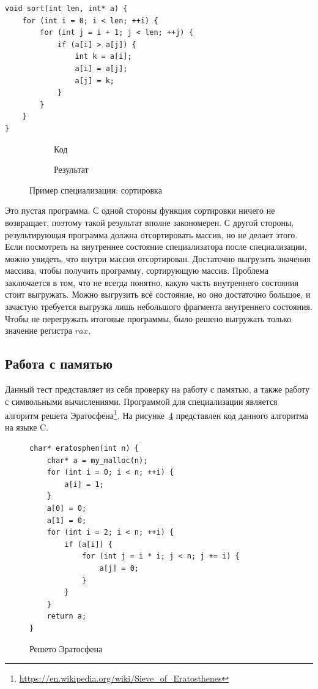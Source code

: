 \newsavebox\boxten
\begin{lrbox}{\boxten}
\begin{lstlisting}[xleftmargin = 20pt]
void sort(int len, int* a) {
    for (int i = 0; i < len; ++i) {
        for (int j = i + 1; j < len; ++j) {
            if (a[i] > a[j]) {
                int k = a[i];
                a[i] = a[j];
                a[j] = k;
            }
        }
    }
}
\end{lstlisting}
\end{lrbox}

\begin{figure}[!t]
\centering
    	\begin{subfigure}[b]{0.5\textwidth}
	    \centering
        \usebox\boxten
        \caption{Код\label{fig:sort}}
    \end{subfigure}
    \begin{subfigure}[b]{0.5\textwidth}
	    \centering
        \usebox\boxnine
        \caption{Результат\label{fig:sortres}}
    \end{subfigure}
\caption{Пример специализации: сортировка}
\end{figure}


Это пустая программа. С одной стороны функция сортировки ничего не возвращает, поэтому такой результат вполне закономерен. С другой стороны, результирующая программа должна отсортировать массив, но не делает этого. Если посмотреть на внутреннее состояние специализатора после специализации, можно увидеть, что внутри массив отсортирован. Достаточно выгрузить значения массива, чтобы получить программу, сортирующую массив. Проблема заключается в том, что не всегда понятно, какую часть внутреннего состояния стоит выгружать. Можно выгрузить всё состояние, но оно достаточно большое, и зачастую требуется выгрузка лишь небольшого фрагмента внутреннего состояния. Чтобы не перегружать итоговые программы, было решено выгружать только значение регистра $rax$. 

\subsection{ Работа с памятью}

Данный тест представляет из себя проверку на работу с памятью, а также работу с символьными вычислениями. Программой для специализации является алгоритм решета Эратосфена\footnote{\url{https://en.wikipedia.org/wiki/Sieve_of_Eratosthenes}}. На рисунке~\ref{fig:era} представлен код данного алгоритма на языке \textsf{C}.
\begin{figure}[t]
\begin{lstlisting}[xleftmargin = 20pt]
char* eratosphen(int n) {
    char* a = my_malloc(n);
    for (int i = 0; i < n; ++i) {
        a[i] = 1;
    }
    a[0] = 0;
    a[1] = 0;
    for (int i = 2; i < n; ++i) {
        if (a[i]) {
            for (int j = i * i; j < n; j += i) {
                a[j] = 0;
            }
        }
    }
    return a;
}
\end{lstlisting}
\caption{ Решето Эратосфена}
\label{fig:era}
\end{figure}


